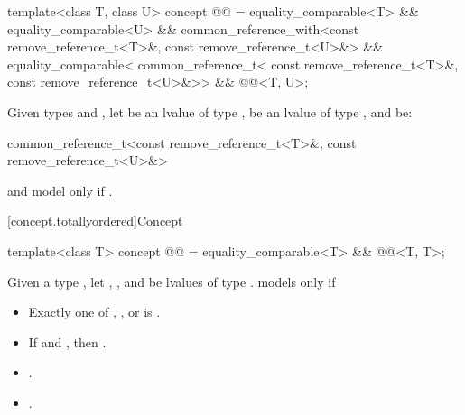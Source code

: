 \begin{itemdecl}
template<class T, class U>
  concept @@ =
    equality_comparable<T> && equality_comparable<U> &&
    common_reference_with<const remove_reference_t<T>&, const remove_reference_t<U>&> &&
    equality_comparable<
      common_reference_t<
        const remove_reference_t<T>&,
        const remove_reference_t<U>&>> &&
    @@<T, U>;
\end{itemdecl}

\begin{itemdescr}
\pnum
Given types  and ,
let  be an lvalue of type ,
 be an lvalue of type ,
and  be:
\begin{codeblock}
common_reference_t<const remove_reference_t<T>&, const remove_reference_t<U>&>
\end{codeblock}
 and  model
 only if
.
\end{itemdescr}

[concept.totallyordered]{Concept }

\begin{itemdecl}
template<class T>
  concept @@ =
    equality_comparable<T> && @@<T, T>;
\end{itemdecl}

\begin{itemdescr}
\pnum
Given a type , let , , and  be
lvalues of type .
 models  only if

\begin{itemize}
\item Exactly one of , , or
       is .
\item If  and , then
      .
\item {}.
\item {}.
\end{itemize}

\end{itemdescr}

